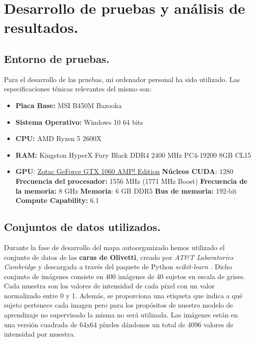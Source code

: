 \chapter{Desarrollo de pruebas y análisis de resultados.}
\section{Entorno de pruebas.}
Para el desarrollo de las pruebas, mi ordenador personal ha sido utilizado. Las especificaciones ténicas relevantes del mismo son:

\begin{itemize}
\item \textbf{Placa Base:} MSI B450M Bazooka
\item \textbf{Sistema Operativo:} Windows 10 64 bits
\item \textbf{CPU:} AMD Ryzen 5 2600X
\item \textbf{RAM:} Kingston HyperX Fury Black DDR4 2400 MHz PC4-19200 8GB CL15
\item \textbf{GPU}: \underline{Zotac GeForce GTX 1060 AMP! Edition}
\subitem \textbf{Núcleos CUDA}: 1280
\subitem \textbf{Frecuencia del procesador:} 1556 MHz (1771 MHz Boost)
\subitem \textbf{Frecuencia de la memoria:} 8 GHz
\subitem \textbf{Memoria}: 6 GB DDR5
\subitem \textbf{Bus de memoria:} 192-bit
\subitem \textbf{Compute Capability:} 6.1

\end{itemize}

\newpage

\section{Conjuntos de datos utilizados.}

Durante la fase de desarrollo del mapa autoorganizado hemos utilizado el conjunto de datos de las \textbf{caras de Olivetti}, creado por \textit{AT\&T Laboratories Cambridge} y descargada a través del paquete de Python \textit{scikit-learn} \cite{olivetti}. Dicho conjunto de imágenes consiste en 400 imágenes de 40 sujetos en escala de grises. Cada muestra son los valores de intensidad de cada píxel con un valor normalizado entre 0 y 1. Además, se proporciona una etiqueta que indica a qué sujeto pertenece cada imagen pero para los propósitos de nuestro modelo de aprendizaje no supervisado la misma no será utilizada. Las imágenes están en una versión cuadrada de 64x64 píxeles dándonos un total de 4096 valores de intensidad por muestra. \\

